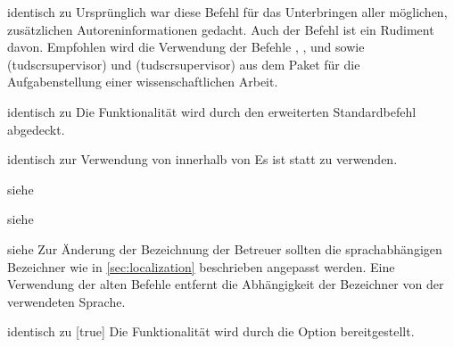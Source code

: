 \begin{Declaration*}{}
\begin{Declaration}{}{%
  identisch zu %
}
\printdeclarationlist*%
%
Ursprünglich war diese Befehl für das Unterbringen aller möglichen, 
zusätzlichen Autoreninformationen gedacht. Auch der Befehl  
ist ein Rudiment davon. Empfohlen wird die Verwendung der Befehle 
, ,  und 
 sowie (tudscrsupervisor) und 
(tudscrsupervisor) aus dem Paket  
für die Aufgabenstellung einer wissenschaftlichen Arbeit.
\end{Declaration}

\begin{Declaration}{}{%
  identisch zu %
}
\printdeclarationlist*%
%
Die Funktionalität wird durch den erweiterten Standardbefehl  
abgedeckt.
\end{Declaration}

\begin{Declaration}{}{%
  identisch zur Verwendung von  innerhalb von %
}
\printdeclarationlist*%
%
Es ist 
statt  zu verwenden.
\end{Declaration}

\begin{Declaration}{}{%
  siehe %
}
\begin{Declaration}{}{%
  siehe %
}
\begin{Declaration}{}{%
  siehe %
}
\printdeclarationlist*%
%
Zur Änderung der Bezeichnung der Betreuer sollten die sprachabhängigen 
Bezeichner wie in \autoref{sec:localization} beschrieben angepasst werden. Eine 
Verwendung der alten Befehle entfernt die Abhängigkeit der Bezeichner von der 
verwendeten Sprache.
\end{Declaration}
\end{Declaration}
\end{Declaration}

\begin{Declaration}{}{%
  identisch zu [true]%
}
\printdeclarationlist*%
%
Die Funktionalität wird durch die Option  bereitgestellt.
\end{Declaration}


\end{Declaration*}
